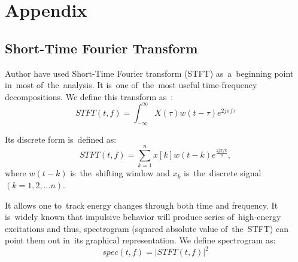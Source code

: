 \chapter{Appendix}\label{append}








\section{Short-Time Fourier Transform}\label{STFT}

Author have used Short-Time Fourier transform (STFT) as~a~beginning point in~most of~the~analysis. It is~one of~the~most useful time-frequency decompositions. We define this transform as~\cite{allen1977short}:
\begin{equation}
STFT(t,f)=\int_{-\infty}^{\infty} X(\tau) w(t-\tau) e^{2 j \pi f \tau}
\end{equation}

Its discrete form is~defined as:
\begin{equation}
STFT(t,f)=\sum_{k=1}^{n} x[k] w(t-k) e^{\frac{2 j \pi f k}{n}},
\end{equation}
where $w(t-k)$ is~the~shifting window and $x_k$ is~the~discrete signal $(k=1,2,...n)$.

It allows one to~track energy changes through both time and frequency. It is~widely known that impulsive behavior will produce series of~high-energy excitations and thus, spectrogram (squared absolute value of~the~STFT) can point them out in~its graphical representation. We define spectrogram as:
\begin{equation}
spec(t,f)=|STFT(t,f)|^2
\end{equation} 

